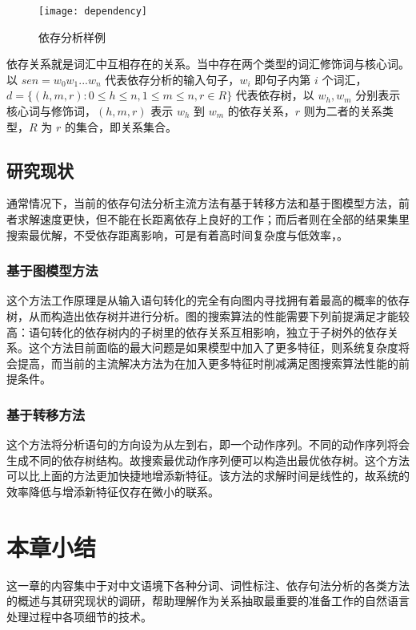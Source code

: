 \begin{figure}[ht]
\centering
\texttt{[image: dependency]}
\caption[依存分析样例]{依存分析样例}\label{fig:dependency}
\end{figure}

依存关系就是词汇中互相存在的关系。当中存在两个类型的词汇修饰词与核心词。以 $sen = w_0w_1...w_n$ 代表依存分析的输入句子，$w_i$ 即句子内第 $i$ 个词汇，$d = \{ \left( h,m,r\right) :0\leq h\leq n,1\leq m\leq n,r\in R \}$ 代表依存树，以 $w_h, w_m$ 分别表示核心词与修饰词，$\left( h,m,r\right)$ 表示 $w_h$ 到 $w_m$ 的依存关系，$r$ 则为二者的关系类型，$R$ 为 $r$ 的集合，即关系集合。

\subsection{研究现状}
通常情况下，当前的依存句法分析主流方法有基于转移方法和基于图模型方法，前者求解速度更快，但不能在长距离依存上良好的工作；而后者则在全部的结果集里搜索最优解，不受依存距离影响，可是有着高时间复杂度与低效率，。

\subsubsection{基于图模型方法}
这个方法工作原理是从输入语句转化的完全有向图内寻找拥有着最高的概率的依存树，从而构造出依存树并进行分析。图的搜索算法的性能需要下列前提满足才能较高：语句转化的依存树内的子树里的依存关系互相影响，独立于子树外的依存关系。这个方法目前面临的最大问题是如果模型中加入了更多特征，则系统复杂度将会提高，而当前的主流解决方法为在加入更多特征时削减满足图搜索算法性能的前提条件。

\subsubsection{基于转移方法}
这个方法将分析语句的方向设为从左到右，即一个动作序列。不同的动作序列将会生成不同的依存树结构。故搜索最优动作序列便可以构造出最优依存树。这个方法可以比上面的方法更加快捷地增添新特征。该方法的求解时间是线性的，故系统的效率降低与增添新特征仅存在微小的联系。

\section{本章小结}
这一章的内容集中于对中文语境下各种分词、词性标注、依存句法分析的各类方法的概述与其研究现状的调研，帮助理解作为关系抽取最重要的准备工作的自然语言处理过程中各项细节的技术。